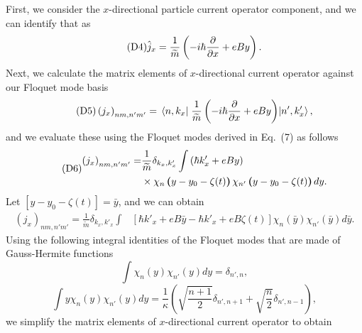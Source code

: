 \documentclass{article}
\begin{document}
\begin{itemize}
{  First, we consider the $x$-directional particle current operator component, and we can identify that as
  \begin{equation} \tag{D4}
    \hat{j}_x = \frac{1}{\widetilde{m}} \left(-i\hbar\pdv{x} + eBy \right).
  \end{equation}
  Next, we calculate the matrix elements of $x$-directional current operator against our Floquet mode basis
  \begin{equation} \tag{D5}
    \left({j}_x \right)_{nm,n'm'} =
    \mel{n,k_x}{\;\frac{1}{\widetilde{m}} \left(-i\hbar\pdv{x} + eBy \right)}{n',k'_x},
  \end{equation}
  and we evaluate these using the Floquet modes derived in Eq.~(7) as follows
  \begin{equation} \tag{D6}
    \begin{aligned}
      \left({j}_x \right)_{nm,n'm'} = &
      \frac{1}{{\widetilde{m}}}
      \delta_{k_x,k'_x}
      \int
      \left(\hbar k'_x + eBy\right) \\
      & \times
       \chi_{n}\bm{\left(}y - y_0 - \zeta(t)\bm{\right)}
      \chi_{n'}\bm{\left(}y - y_0 - \zeta(t)\bm{\right)}
      dy.
    \end{aligned}
  \end{equation}
  Let $[y - y_0 - \zeta(t)] = \bar{y}$, and we can obtain
  \begin{equation} \tag{D7}
    \begin{aligned}
      \left({j}_x \right)_{nm,n'm'} =
      \frac{1}{{\widetilde{m}}}
      \delta_{k_x,k'_x}
      \int &
      \left[ \hbar k'_x + eB\bar{y} -\hbar k'_x + eB\zeta(t)\right]
      \chi_{n}(\bar{y})
      \chi_{n'}(\bar{y})
      d\bar{y}.
    \end{aligned}
  \end{equation}
  Using the following integral identities of the Floquet modes that are made of Gauss-Hermite functions \cite{vedenyapin11,szego59}
  \begin{equation} \tag{D8}
    \int
    \chi_{n}({y})
    \chi_{n'}({y}) d{y} =
    \delta_{n',n},
  \end{equation}
  \begin{equation} \tag{D9}
    \int
    y \chi_{n}({y})\chi_{n'}({y}) d{y} =
    \frac{1}{\kappa}
    \left(\sqrt{\frac{n+1}{2}} \delta_{n',n+1} + \sqrt{\frac{n}{2}}
    \delta_{n',n-1} \right),
  \end{equation}
  we simplify the matrix elements of $x$-directional current operator to obtain
  \begin{equation} \tag{D10}

\end{equation}}
\end{itemize}
\end{document}
